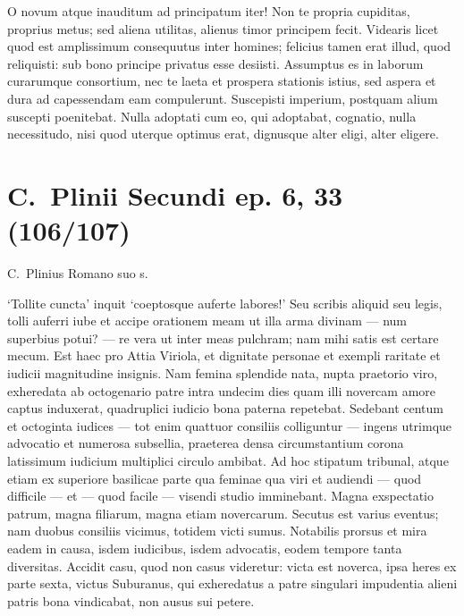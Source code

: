 O novum atque inauditum ad principatum iter! Non te propria cupiditas, proprius metus; sed aliena utilitas, alienus timor principem fecit. Videaris licet quod est amplissimum consequutus inter homines; felicius tamen erat illud, quod reliquisti: sub bono principe privatus esse desiisti. Assumptus es in laborum curarumque consortium, nec te laeta et prospera stationis istius, sed aspera et dura ad capessendam eam compulerunt. Suscepisti imperium, postquam alium suscepti poenitebat. Nulla adoptati cum eo, qui adoptabat, cognatio, nulla necessitudo, nisi quod uterque optimus erat, dignusque alter eligi, alter eligere.

\newpage

\section*{C.\ Plinii Secundi ep. 6, 33 (106/107)}

C.\ Plinius Romano suo s.

\medskip

\noindent `Tollite cuncta' inquit `coeptosque auferte labores!' Seu scribis aliquid seu legis, tolli auferri iube et accipe orationem meam ut illa arma divinam — num superbius potui? — re vera ut inter meas pulchram; nam mihi satis est certare mecum. Est haec pro Attia Viriola, et dignitate personae et exempli raritate et iudicii magnitudine insignis. Nam femina splendide nata, nupta praetorio viro, exheredata ab octogenario patre intra undecim dies quam illi novercam amore captus induxerat, quadruplici iudicio bona paterna repetebat. Sedebant centum et octoginta iudices — tot enim quattuor consiliis colliguntur — ingens utrimque advocatio et numerosa subsellia, praeterea densa circumstantium corona latissimum iudicium multiplici circulo ambibat. Ad hoc stipatum tribunal, atque etiam ex superiore basilicae parte qua feminae qua viri et audiendi — quod difficile — et — quod facile — visendi studio imminebant. Magna exspectatio patrum, magna filiarum, magna etiam novercarum. Secutus est varius eventus; nam duobus consiliis vicimus, totidem victi sumus. Notabilis prorsus et mira eadem in causa, isdem iudicibus, isdem advocatis, eodem tempore tanta diversitas. Accidit casu, quod non casus videretur: victa est noverca, ipsa heres ex parte sexta, victus Suburanus, qui exheredatus a patre singulari impudentia alieni patris bona vindicabat, non ausus sui petere.

